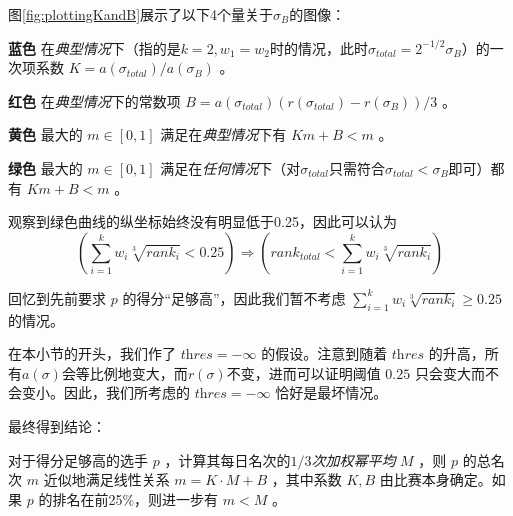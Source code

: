             图\ref{fig:plottingKandB}展示了以下4个量关于$\sigma_B$的图像：
            \begin{asparaitem}
                \vspace{1ex}
                \item [\textbf{蓝色}] 在\emph{典型情况}下（指的是$k=2,w_1=w_2$时的情况，此时$\sigma_{\textit{total}}=2^{-1/2}\sigma_B$）的一次项系数 $K=a(\sigma_{\textit{total}})/a(\sigma_B)$ 。
                \vspace{1ex}
                \item [\textbf{红色}] 在\emph{典型情况}下的常数项 $B=a(\sigma_{\textit{total}})\left(r(\sigma_{\textit{total}})-r(\sigma_B)\right)/3$ 。
                \vspace{1ex}
                \item [\textbf{黄色}] 最大的 $m\in [0,1]$ 满足在\emph{典型情况}下有 $Km+B<m$ 。
                \vspace{1ex}
                \item [\textbf{绿色}] 最大的 $m\in [0,1]$ 满足在\emph{任何情况}下（对$\sigma_{\textit{total}}$只需符合$\sigma_{\textit{total}}<\sigma_B$即可）都有 $Km+B<m$ 。
                \vspace{1ex}
            \end{asparaitem}

            观察到绿色曲线的纵坐标始终没有明显低于0.25，因此可以认为
            $$
            \left(\sum\limits_{i=1}^k w_i\sqrt[3]{\textit{rank}_i}<0.25\right)\Rightarrow
            \left(\textit{rank}_{\textit{total}}<\sum\limits_{i=1}^k w_i\sqrt[3]{\textit{rank}_i}\right)
            $$

            回忆到先前要求 $p$ 的得分“足够高”，因此我们暂不考虑 $\sum\limits_{i=1}^k w_i\sqrt[3]{\textit{rank}_i}\geq 0.25$ 的情况。

            在本小节的开头，我们作了 $\textit{thres}=-\infty$ 的假设。注意到随着 $\textit{thres}$ 的升高，所有$a(\sigma)$会等比例地变大，而$r(\sigma)$不变，进而可以证明阈值 $0.25$ 只会变大而不会变小。因此，我们所考虑的 $\textit{thres}=-\infty$ 恰好是最坏情况。

            \vspace{1.5ex}

            最终得到结论：

            \begin{tcolorbox}[colback=white,colframe=black,boxrule=0.5pt,arc=0pt]
                对于得分足够高的选手 $p$ ，计算其每日名次的\emph{$1/3$次加权幂平均} $M$ ，则 $p$ 的总名次 $m$ 近似地满足线性关系 $m=K\cdot M+B$ ，其中系数 $K,B$ 由比赛本身确定。如果 $p$ 的排名在前25\%，则进一步有 $m<M$ 。
            \end{tcolorbox}

